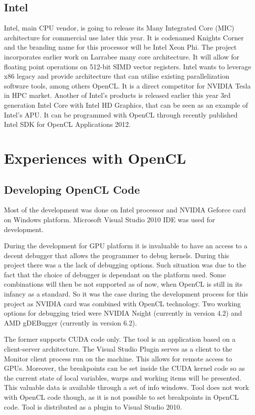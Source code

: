 \subsection{Intel}
Intel, main CPU vendor, is going to release its Many Integrated Core (MIC) architecture for commercial use later this year.\cite{intel2012mic} It is codenamed Knights Corner and the branding name for this processor will be Intel Xeon Phi.\cite{xeon2012} The project incorporates earlier work on Larrabee many core architecture. It will allow for floating point operations on 512-bit SIMD vector registers. Intel wants to leverage x86 legacy and provide architecture that can utilise existing parallelization software tools, among others OpenCL. It is a direct competitor for NVIDIA Tesla in HPC market. Another of Intel's products is released earlier this year 3rd generation Intel Core with Intel HD Graphics, that can be seen as an example of Intel's APU. It can be programmed with OpenCL through recently published Intel SDK for OpenCL Applications 2012.\cite{intel2012openclapp}

\section{Experiences with OpenCL}
\subsection{Developing OpenCL Code}
Most of the development was done on Intel processor and NVIDIA Geforce card on Windows platform. Microsoft Visual Studio 2010 IDE was used for development.

During the development for GPU platform it is invaluable to have an access to a decent debugger that allows the programmer to debug kernels. During this project there was a the lack of debugging options. Such situation was due to the fact that the choice of debugger is dependant on the platform used. Some combinations will then be not supported as of now, when OpenCL is still in its infancy as a standard. So it was the case during the development process for this project as NVIDIA card was combined with OpenCL technology.  Two working options for debugging tried were NVIDIA Nsight (currently in version 4.2) and AMD gDEBugger (currently in version 6.2).\cite{nvidia2012nsight, amd2012gdeb}

The former supports CUDA code only. The tool is an application based on a client-server architecture.  The Visual Studio Plugin serves as a client to the Monitor client process run on the machine. This allows for remote access to GPUs. Moreover, the breakpoints can be set inside the CUDA kernel code so as the current state of local variables, warps and working items will be presented. This valuable data is available through a set of info windows. Tool does not work with OpenCL code though, as it is not possible to set breakpoints in OpenCL code. Tool is distributed as a plugin to Visual Studio 2010.

